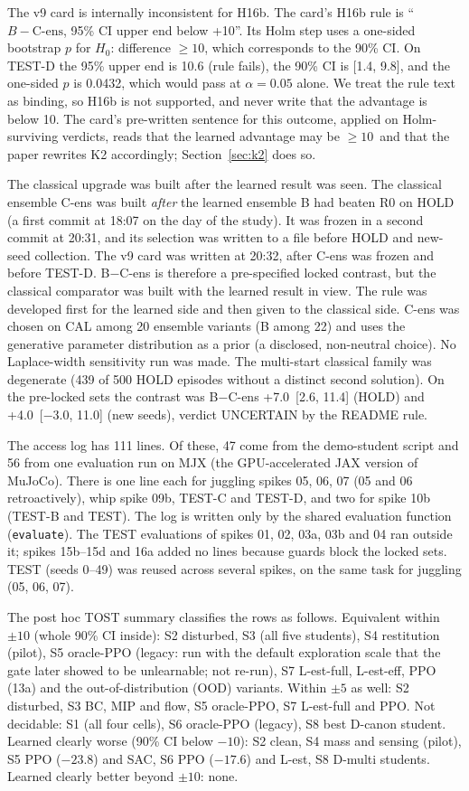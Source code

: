 The v9 card is internally inconsistent for H16b. The card's H16b rule is ``$B-\text{C-ens}$, 95\% CI upper end below +10\pp''. Its Holm step uses a one-sided bootstrap $p$ for $H_0$: difference $\ge 10$, which corresponds to the 90\% CI. On TEST-D the 95\% upper end is 10.6 (rule fails), the 90\% CI is [1.4, 9.8], and the one-sided $p$ is 0.0432, which would pass at $\alpha=0.05$ alone. We treat the rule text as binding, so H16b is not supported, and never write that the advantage is below 10\pp. The card's pre-written sentence for this outcome, applied on Holm-surviving verdicts, reads that the learned advantage may be $\ge10$\pp\ and that the paper rewrites K2 accordingly; Section~\ref{sec:k2} does so.

The classical upgrade was built after the learned result was seen. The classical ensemble C-ens was built \emph{after} the learned ensemble B had beaten R0 on HOLD (a first commit at 18:07 on the day of the study). It was frozen in a second commit at 20:31, and its selection was written to a file before HOLD and new-seed collection. The v9 card was written at 20:32, after C-ens was frozen and before TEST-D. B$-$C-ens is therefore a pre-specified locked contrast, but the classical comparator was built with the learned result in view. The rule was developed first for the learned side and then given to the classical side. C-ens was chosen on CAL among 20 ensemble variants (B among 22) and uses the generative parameter distribution as a prior (a disclosed, non-neutral choice). No Laplace-width sensitivity run was made. The multi-start classical family was degenerate (439 of 500 HOLD episodes without a distinct second solution). On the pre-locked sets the contrast was B$-$C-ens +7.0\pp\ [2.6, 11.4] (HOLD) and +4.0\pp\ [$-3.0$, 11.0] (new seeds), verdict UNCERTAIN by the README rule.

The access log has 111 lines. Of these, 47 come from the demo-student script and 56 from one evaluation run on MJX (the GPU-accelerated JAX version of MuJoCo). There is one line each for juggling spikes 05, 06, 07 (05 and 06 retroactively), whip spike 09b, TEST-C and TEST-D, and two for spike 10b (TEST-B and TEST). The log is written only by the shared evaluation function (\texttt{evaluate}). The TEST evaluations of spikes 01, 02, 03a, 03b and 04 ran outside it; spikes 15b--15d and 16a added no lines because guards block the locked sets. TEST (seeds 0--49) was reused across several spikes, on the same task for juggling (05, 06, 07).

The post hoc TOST summary classifies the rows as follows. Equivalent within $\pm10$ (whole 90\% CI inside): S2 disturbed, S3 (all five students), S4 restitution (pilot), S5 oracle-PPO (legacy: run with the default exploration scale that the gate later showed to be unlearnable; not re-run), S7 L-est-full, L-est-eff, PPO (13a) and the out-of-distribution (OOD) variants. Within $\pm5$ as well: S2 disturbed, S3 BC, MIP and flow, S5 oracle-PPO, S7 L-est-full and PPO. Not decidable: S1 (all four cells), S6 oracle-PPO (legacy), S8 best D-canon student. Learned clearly worse (90\% CI below $-10$): S2 clean, S4 mass and sensing (pilot), S5 PPO ($-23.8$) and SAC, S6 PPO ($-17.6$) and L-est, S8 D-multi students. Learned clearly better beyond $\pm10$: none.

